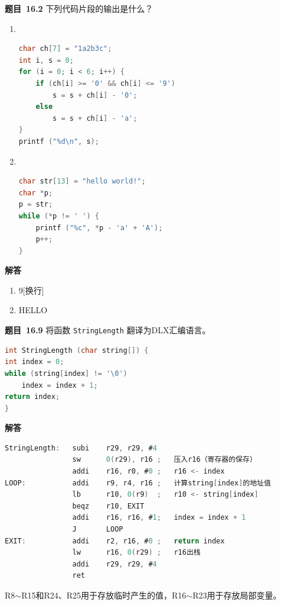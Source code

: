 \documentclass[10pt,a4paper,UTF8]{ctexart}
\newcommand{\problemname}{待定义}
\newenvironment{problem}{\begin{shaded}\par\noindent\textbf{题目\  \problemname}}{\end{shaded}\par}
\newenvironment{solution}{\par\noindent\textbf{解答}\ }{\par}
\begin{document}
\renewcommand{\problemname}{16.2}
\begin{problem}
	下列代码片段的输出是什么？
	\begin{enumerate}[(1)]
		\item \ \begin{lstlisting}[language=C]
char ch[7] = "1a2b3c"; 
int i, s = 0; 
for (i = 0; i < 6; i++) { 
	if (ch[i] >= '0' && ch[i] <= '9') 
		s = s + ch[i] - '0'; 
	else 
		s = s + ch[i] - 'a'; 
} 
printf ("%d\n", s); 
		\end{lstlisting}
		\item \ \begin{lstlisting}[language=C]
char str[13] = "hello world!"; 
char *p; 
p = str; 
while (*p != ' ') { 
	printf ("%c", *p - 'a' + 'A'); 
	p++; 
}
		\end{lstlisting}
	\end{enumerate}
\end{problem}

\begin{solution}
	\begin{enumerate}[(1)]
		\item 9[换行]
		\item HELLO
	\end{enumerate}
\end{solution}


\renewcommand{\problemname}{16.9}
\begin{problem}
	将函数 \verb|StringLength| 翻译为DLX汇编语言。
	\begin{lstlisting}[language=C]
int StringLength (char string[]) { 
int index = 0; 
while (string[index] != '\0') 
	index = index + 1; 
return index; 
} 
	\end{lstlisting}
\end{problem}

\begin{solution}
	\begin{lstlisting}[language=C]
StringLength:	subi	r29, r29, #4 
				sw		0(r29), r16	; 	压入r16（寄存器的保存） 
				addi	r16, r0, #0	; 	r16 <- index
LOOP:			addi 	r9, r4, r16	; 	计算string[index]的地址值 
				lb		r10, 0(r9) 	; 	r10 <- string[index]
				beqz 	r10, EXIT
				addi	r16, r16, #1; 	index = index + 1
				J 		LOOP
EXIT:			addi 	r2, r16, #0	; 	return index
				lw		r16, 0(r29)	; 	r16出栈
				addi	r29, r29, #4 
				ret 

	\end{lstlisting}
	R8$\sim$R15和R24、R25用于存放临时产生的值，R16$\sim$R23用于存放局部变量。
\end{solution}
\end{document}
